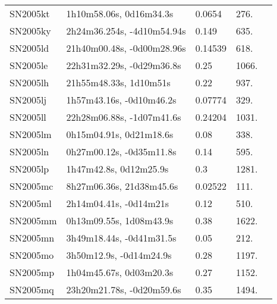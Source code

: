 \begin{longtable}{lllll}
         SN2005kt &        1h10m58.06s, 0d16m34.3s &   0.0654 &           276. &    \citet{2003SDSS1.C...0000:} \\
         SN2005ky &     2h24m36.254s, -4d10m54.94s &    0.149 &           635. &  \citet{2009AandA...507...85B} \\
         SN2005ld &     21h40m00.48s, -0d00m28.96s &  0.14539 &           618. &    \citet{2013ApJ...763...88C} \\
         SN2005le &      22h31m32.29s, -0d29m36.8s &     0.25 &          1066. &    \citet{2005IAUC.8640A...1F} \\
         SN2005lh &         21h55m48.33s, 1d10m51s &     0.22 &           937. &    \citet{2005IAUC.8640A...1F} \\
         SN2005lj &       1h57m43.16s, -0d10m46.2s &  0.07774 &           329. &    \citet{2016SDSSD.C...0000:} \\
         SN2005ll &      22h28m06.88s, -1d07m41.6s &  0.24204 &          1031. &    \citet{2016SDSSD.C...0000:} \\
         SN2005lm &        0h15m04.91s, 0d21m18.6s &     0.08 &           338. &    \citet{2005IAUC.8640A...1F} \\
         SN2005ln &       0h27m00.12s, -0d35m11.8s &     0.14 &           595. &    \citet{2005IAUC.8640A...1F} \\
         SN2005lp &         1h47m42.8s, 0d12m25.9s &      0.3 &          1281. &    \citet{2005IAUC.8640A...1F} \\
         SN2005mc &       8h27m06.36s, 21d38m45.6s &  0.02522 &           111. &    \citet{1991RC3.9.C...0000d} \\
         SN2005ml &         2h14m04.41s, -0d14m21s &     0.12 &           510. &    \citet{2005IAUC.8651A...1F} \\
         SN2005mm &        0h13m09.55s, 1d08m43.9s &     0.38 &          1622. &    \citet{2005IAUC.8651A...1F} \\
         SN2005mn &       3h49m18.44s, -0d41m31.5s &     0.05 &           212. &    \citet{2005IAUC.8651A...1F} \\
         SN2005mo &        3h50m12.9s, -0d14m24.9s &     0.28 &          1197. &    \citet{2005IAUC.8651A...1F} \\
         SN2005mp &        1h04m45.67s, 0d03m20.3s &     0.27 &          1152. &    \citet{2005IAUC.8651A...1F} \\
         SN2005mq &      23h20m21.78s, -0d20m59.6s &     0.35 &          1494. &    \citet{2005IAUC.8651A...1F} \\

\end{longtable}
